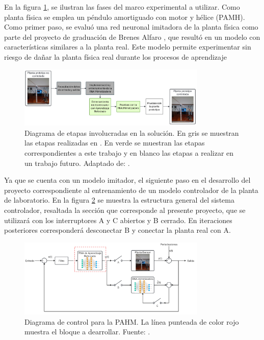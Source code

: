En la figura \ref{fig:DiagProyecto}, se ilustran las fases del marco experimental a utilizar. Como planta física se emplea un péndulo amortiguado con motor y hélice (PAMH). Como primer paso, se evaluó una red neuronal imitadora de la planta física como parte del proyecto de graduación de Brenes Alfaro \cite{JorgeBrenes}, que resultó en un modelo con características similares a la planta real. Este modelo permite experimentar sin riesgo de dañar la planta física real durante los procesos de aprendizaje

\begin{figure}[h]
    \centering
    \includegraphics[width=0.8\textwidth]{fig/new/DiagProyecto.png}
    \caption{Diagrama de etapas involucradas en la solución. En gris se muestran las etapas realizadas en \cite{JorgeBrenes}. En verde se muestran las etapas correspondientes a este trabajo y en blanco las etapas a realizar en un trabajo futuro. Adaptado de: \cite{JorgeBrenes}.}
    \label{fig:DiagProyecto}
\end{figure}

Ya que se cuenta con un modelo imitador, el siguiente paso en el desarrollo del proyecto correspondiente al entrenamiento de un modelo controlador de la planta de laboratorio. En la figura \ref{fig:DiagramaGeneral} se muestra la estructura general del sistema controlador, resaltada la sección que corresponde al presente proyecto, que se utilizará con los interruptores A y C abiertos y B cerrado. En iteraciones posteriores corresponderá desconectar B y conectar la planta real con A.

\begin{figure}[h]
    \centering
    \includegraphics[width=0.8\textwidth]{fig/new/DiagramaGeneralv2.png}
    \caption{Diagrama de control para la PAHM. La línea punteada de color rojo muestra el bloque a dearrollar. Fuente: \cite{JorgeBrenes}.}
    \label{fig:DiagramaGeneral}
\end{figure}



